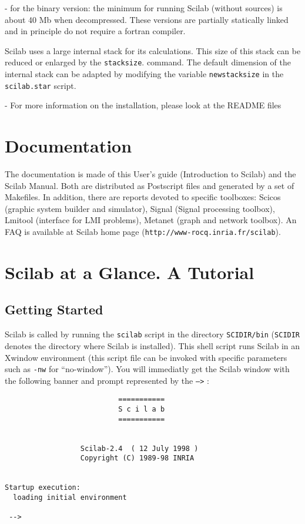 - for the binary version: the minimum for running Scilab (without
sources) is about 40 Mb when decompressed.
These versions  are partially statically linked and in principle do not require a fortran compiler.

\label{stks}
Scilab uses a large internal stack for its calculations. This size
of this stack can be reduced or enlarged by the 
{\tt stacksize}.
command. The default dimension of the internal stack can be adapted
by modifying the variable {\tt newstacksize} in the {\tt scilab.star}
script.

- For more information on the installation, please look at the README files

\section{Documentation}

The documentation is made of this User's guide (Introduction to
Scilab) and the Scilab Manual. Both are distributed as Postscript
files and generated by a set of Makefiles. In addition, there are
reports devoted to specific toolboxes: Scicos (graphic system builder
and simulator), Signal (Signal processing toolbox), Lmitool (interface for 
LMI problems), Metanet (graph and network toolbox). An FAQ is
available at Scilab home page 
(\verb!http://www-rocq.inria.fr/scilab!).

\section{Scilab at a Glance. A Tutorial}

\subsection{Getting Started}

Scilab is called by running the {\tt scilab} script in the 
directory {\tt SCIDIR/bin} ({\tt SCIDIR} denotes the directory 
where Scilab is installed).
This shell script  runs Scilab in an Xwindow environment (this 
script file can be invoked with
specific parameters such as \verb!-nw! for ``no-window'').
You will immediatly get the Scilab window with the following banner and 
prompt represented by the {\tt -->} : 


\bigskip

\begin{verbatim}
                           ===========
                           S c i l a b
                           ===========
 
 
                  Scilab-2.4  ( 12 July 1998 ) 
                  Copyright (C) 1989-98 INRIA 
 
 
Startup execution:
  loading initial environment
   
 -->

\end{verbatim}


